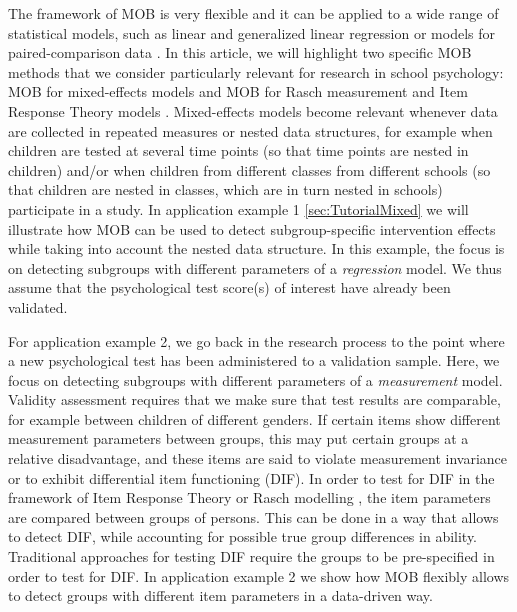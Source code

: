 \documentclass[doc,floatsintext,natbib]{apa7}
\begin{document}
The framework of MOB is very flexible and it can be applied to a wide range of statistical models, such as linear and generalized linear regression \citep{KopAugStr:2013,ZeilyHoth08} or models for paired-comparison data \citep{StrWicZei:2011:JoEaBS,WiedyFrick21}. In this article, we will highlight two specific MOB methods that we consider particularly relevant for research in school psychology: MOB for mixed-effects models \citep{FokkySmit18} and MOB for Rasch measurement and Item Response Theory models \citep[IRT,][]{StrKopZei:2015:P,KomStrZei:2017:EaPM,HenDebStr:2023:EPM}. Mixed-effects models become relevant whenever data are collected in repeated measures or nested data structures, for example when children are tested at several time points (so that time points are nested in children) and/or when children from different classes from different schools (so that children are nested in classes, which are in turn nested in schools) participate in a study. In application example 1 \ref{sec:TutorialMixed} we will illustrate how MOB can be used to detect subgroup-specific intervention effects while taking into account the nested data structure. In this example, the focus is on detecting subgroups with different parameters of a \textit{regression} model. We thus assume that the psychological test score(s) of interest have already been validated. 


For application example 2, we go back in the research process to the point where a new psychological test has been administered to a validation sample. Here, we focus on detecting subgroups with different parameters of a \textit{measurement} model. Validity assessment requires that we make sure that test results are comparable, for example between children of different genders. If certain items show different measurement parameters between groups, this may put certain groups at a relative disadvantage, and these items are said to violate measurement invariance or to exhibit differential item functioning (DIF). In order to test for DIF in the framework of Item Response Theory or Rasch modelling \citep{AnthyDiPe16,DebStrZei:2022:CRC,Mall97}, the item parameters are compared between groups of persons. This can be done in a way that allows to detect DIF, while accounting for possible true group differences in ability. Traditional approaches for testing DIF require the groups to be pre-specified in order to test for DIF. In application example 2 we show how MOB flexibly allows to detect groups with different item parameters in a data-driven way. 
\end{document}
